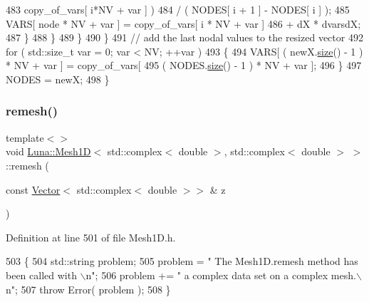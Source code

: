 \begin{DoxyCode}
483                                              copy\_of\_vars[ i*NV + var ] )
484                                             / ( NODES[ i + 1 ] - NODES[ i ] );
485             VARS[ node * NV + var ] =   copy\_of\_vars[ i * NV + var ]
486                                       + dX * dvarsdX;
487           \}
488         \}
489       \}
490     \}
491     \textcolor{comment}{// add the last nodal values to the resized vector}
492     \textcolor{keywordflow}{for} ( std::size\_t var = 0; var < NV; ++var )
493     \{
494       VARS[ ( newX.\hyperlink{classLuna_1_1Vector_ac9b6ed7a0df401728f27c193fbc8f4d8}{size}() - 1 ) * NV + var ] = copy\_of\_vars[
495                                               ( NODES.\hyperlink{classLuna_1_1Vector_ac9b6ed7a0df401728f27c193fbc8f4d8}{size}() - 1 ) * NV + var ];
496     \}
497     NODES = newX;
498   \}
\end{DoxyCode}
\mbox{\label{classLuna_1_1Mesh1D_a0caa5cfc7ced1937c94e692c3bdbdc25}} 
\subsubsection{\texorpdfstring{remesh()}{remesh()}\hspace{0.1cm}{\footnotesize\ttfamily [4/4]}}
{\footnotesize\ttfamily template$<$$>$ \\
void \hyperlink{classLuna_1_1Mesh1D}{Luna\+::\+Mesh1D}$<$ std\+::complex$<$ double $>$, std\+::complex$<$ double $>$ $>$\+::remesh (\begin{DoxyParamCaption}\item[{const \hyperlink{classLuna_1_1Vector}{Vector}$<$ std\+::complex$<$ double $>$$>$ \&}]{z }\end{DoxyParamCaption})}



Definition at line 501 of file Mesh1\+D.\+h.


\begin{DoxyCode}
503   \{
504     std::string problem;
505     problem = \textcolor{stringliteral}{" The Mesh1D.remesh method has been called with \(\backslash\)n"};
506     problem += \textcolor{stringliteral}{" a complex data set on a complex mesh.\(\backslash\)n"};
507     \textcolor{keywordflow}{throw} Error( problem );
508   \}
\end{DoxyCode}
\mbox{\label{classLuna_1_1Mesh1D_ad28b2c5f3505e1296286288ee2f71f13}} 
